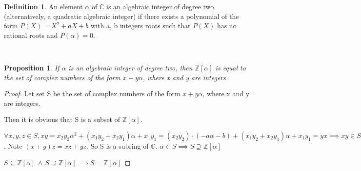 \documentclass{article}
\newtheorem*{proposition}{Proposition}
\theoremstyle{definition}\newtheorem{definition}{Definition}
\begin{document}
\begin{definition}
	An element $\alpha$ of $\mathbb C$ is an algebraic integer of degree two (alternatively, a quadratic algebraic integer) if there exists a polynomial of the form $P (X ) = X^ 2 + aX + b$ with a, b integers roots such that $P (X )$ has
no rational roots and $P (\alpha) = 0$.
\end{definition}
\
\begin{proposition}
	 If $\alpha$ is an algebraic integer of degree two, then $\mathbb Z [\alpha]$ is equal to the set of complex numbers of the form $x + y\alpha$, where x and y are integers.
\end{proposition}
\begin{proof}
	Let set S be the set of complex numbers of the form $x + y\alpha$, where x and y are integers.
	
	Then it is obvious that S is a subset of $\mathbb Z [\alpha]$.
	
	$\forall x,y,z \in S, xy=x_2 y_2 \alpha^2 + (x_1y_2+x_2y_1) \alpha + x_1 y_1= (x_2 y_2)\cdot(-a\alpha-b)+ (x_1y_2+x_2y_1) \alpha + x_1 y_1 = yx \implies xy \in S$. Note $(x+y)z=xz+yz$. So S is a subring of $\mathbb C$. $\alpha \in S \implies S \supseteq \mathbb Z [\alpha]$ 
	
	$S \subseteq \mathbb Z [\alpha] \, \land \, S \supseteq \mathbb Z [\alpha] \implies S=\mathbb Z [\alpha]$
\end{proof}	
			
\end{document}
